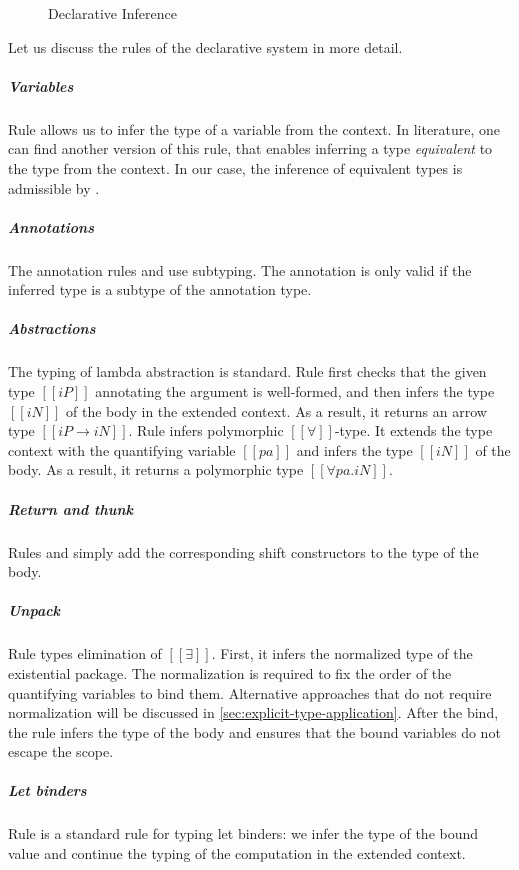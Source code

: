 \begin{figure}[t!]
  \ottdefnsDTLabeled
  \caption{Declarative Inference}
  \label{fig:declarative-inference}
\end{figure}

Let us discuss the rules of the declarative system in more detail.

\subparagraph*{Variables}
    Rule  allows us to infer
    the type of a variable from the context. 
    In literature, one can find another version of this rule,
    that enables inferring a type \emph{equivalent}
    to the type from the context. 
    In our case, the inference of equivalent types is admissible by .


\subparagraph*{Annotations}
  The annotation rules 
  and  use subtyping.
  The annotation is only valid if the
  inferred type is a subtype of the annotation type.

\subparagraph*{Abstractions}
  The typing of lambda abstraction is standard. 
  Rule  first checks
  that the given type $[[iP]]$ annotating the argument is well-formed,
  and then infers the type $[[iN]]$ of the body in the extended context.
  As a result, it returns an arrow type $[[iP → iN]]$.
  Rule  infers polymorphic $[[∀]]$-type. 
  It extends the type context with the quantifying variable $[[pa]]$ and 
  infers the type $[[iN]]$ of the body. As a result, it returns a polymorphic type
  $[[∀pa.iN]]$.

\subparagraph*{Return and thunk}
  Rules  
  and 
  simply add the corresponding shift constructors to the type of the body.

\subparagraph*{Unpack}
  Rule  types elimination of $[[∃]]$.
  First, it infers the normalized type of the existential package.
  The normalization is required to fix the order of the quantifying variables
  to bind them. Alternative approaches that do not require normalization
  will be discussed in \cref{sec:explicit-type-application}.
  After the bind, the rule infers the type of the body 
  and ensures that the bound variables do not escape the scope.

\subparagraph*{Let binders}
  Rule  is a standard rule for typing let
  binders: we infer the type of the bound value and continue the typing of the
  computation in the extended context.


